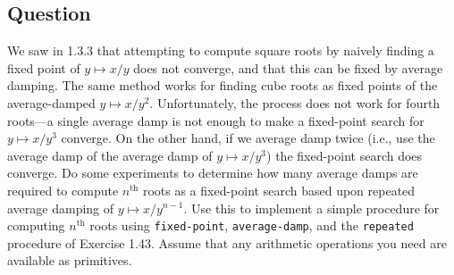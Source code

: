 \documentclass[final,fleqn,titlepage]{article}
\begin{document}
\subsection{Question}
\label{sec:orge6c8eda}
We saw in 1.3.3 that attempting to compute square roots by naively finding a
fixed point of \(y \mapsto x / y\) does not converge, and that this can be fixed by
average damping. The same method works for finding cube roots as fixed points of
the average-damped \(y \mapsto x / y^2\). Unfortunately, the process does not work for
fourth roots---a single average damp is not enough to make a fixed-point search
for \(y \mapsto x / y^3\) converge. On the other hand, if we average damp twice (i.e.,
use the average damp of the average damp of \(y \mapsto x / y^3\)) the fixed-point
search does converge. Do some experiments to determine how many average damps
are required to compute \(n^{\mathrm{th}}\) roots as a fixed-point search based
upon repeated average damping of \(y \mapsto x / y^{n-1}\). Use this to implement a
simple procedure for computing \(n^{\mathrm{th}}\) roots using \texttt{fixed-point},
\texttt{average-damp}, and the \texttt{repeated} procedure of Exercise 1.43. Assume that any
arithmetic operations you need are available as primitives.
\end{document}
